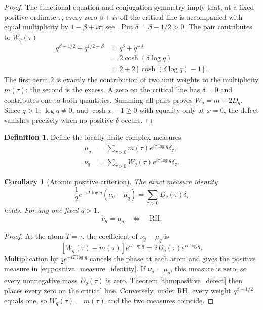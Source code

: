 \documentclass[11pt]{amsart}
\numberwithin{equation}{section}
\theoremstyle{plain}
\newtheorem{corollary}[theorem]{Corollary}
\theoremstyle{definition}
\newtheorem{definition}[theorem]{Definition}
\theoremstyle{remark}
\newcommand{\RH}{\mathrm{RH}}
\newcommand{\1}{\mathbf{1}}
\begin{document}
\begin{proof}
The functional equation and conjugation symmetry imply that, at a fixed
positive ordinate \(\tau\), every zero \(\beta+i\tau\) off the critical
line is accompanied with equal multiplicity by
\(1-\beta+i\tau\); see \cite[Chapter~2]{Titchmarsh1986}.  Put
\(\delta=\beta-1/2>0\).  The pair contributes to \(W_q(\tau)\)
\begin{align}
q^{\beta-1/2}+q^{1/2-\beta}
&=
q^\delta+q^{-\delta}
\label{eq:defect_pair_one}
\\
&=
2\cosh(\delta\log q)
\label{eq:defect_pair_two}
\\
&=
2+2\left[\cosh(\delta\log q)-1\right].
\label{eq:defect_pair_three}
\end{align}
The first term \(2\) is exactly the contribution of two unit weights to
the multiplicity \(m(\tau)\); the second is the excess.  A zero on the
critical line has \(\delta=0\) and contributes one to both quantities.
Summing all pairs proves \(W_q=m+2D_q\).  Since \(q>1\),
\(\log q\neq0\), and \(\cosh x-1\geq0\) with equality only at \(x=0\),
the defect vanishes precisely when no positive \(\delta\) occurs.
\end{proof}

\begin{definition}
\label{def:atomic_measures}
Define the locally finite complex measures
\begin{align}
\mu_q
&=
\sum_{\tau>0}
m(\tau)e^{i\tau\log q}\delta_\tau,
\label{eq:muq_measure}
\\
\nu_q
&=
\sum_{\tau>0}
W_q(\tau)e^{i\tau\log q}\delta_\tau.
\label{eq:nuq_measure}
\end{align}
\end{definition}

\begin{corollary}[Atomic positive criterion]
\label{cor:atomic_positive_criterion}
The exact measure identity
\begin{equation}
\boxed{
\frac12e^{-iT\log q}(\nu_q-\mu_q)
=
\sum_{\tau>0}D_q(\tau)\delta_\tau
}
\label{eq:positive_measure_identity}
\end{equation}
holds.  For any one fixed \(q>1\),
\begin{equation}
\nu_q=\mu_q
\quad\Longleftrightarrow\quad
\RH.
\label{eq:measure_RH_equivalence}
\end{equation}
\end{corollary}

\begin{proof}
At the atom \(T=\tau\), the coefficient of \(\nu_q-\mu_q\) is
\begin{equation}
\left[W_q(\tau)-m(\tau)\right]e^{i\tau\log q}
=
2D_q(\tau)e^{i\tau\log q}.
\label{eq:atomic_difference_coefficient}
\end{equation}
Multiplication by \(\frac12e^{-iT\log q}\) cancels the phase at each
atom and gives the positive measure in
\eqref{eq:positive_measure_identity}.  If \(\nu_q=\mu_q\), this measure
is zero, so every nonnegative mass \(D_q(\tau)\) is zero.  Theorem
\ref{thm:positive_defect} then places every zero on the critical line.
Conversely, under \(\RH\), every weight \(q^{\beta-1/2}\) equals one, so
\(W_q(\tau)=m(\tau)\) and the two measures coincide.
\end{proof}
\end{document}
